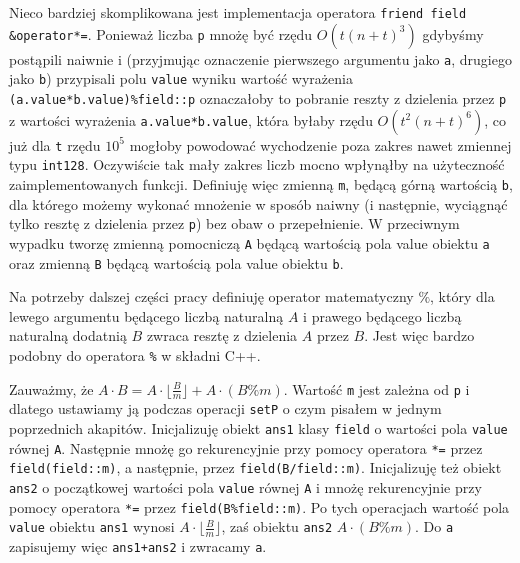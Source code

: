 \documentclass{article}
\begin{document}
Nieco bardziej skomplikowana jest implementacja operatora \texttt{friend field \&operator*=}. Ponieważ liczba 
\texttt{p} mnożę być rzędu $O(t(n+t)^3)$ gdybyśmy postąpili naiwnie i (przyjmując 
oznaczenie pierwszego argumentu jako \texttt{a}, drugiego jako \texttt{b}) 
przypisali polu \texttt{value} wyniku wartość wyrażenia
\newline \texttt{(a.value*b.value)\%field::p} oznaczałoby to pobranie reszty z dzielenia przez \texttt{p} z 
wartości wyrażenia
\texttt{a.value*b.value}, która 
byłaby rzędu $O(t^2(n+t)^6)$, co już dla \texttt{t} rzędu $10^5$ mogłoby powodować 
wychodzenie poza zakres nawet zmiennej typu 
\texttt{\textunderscore \textunderscore int128}. 
Oczywiście tak mały zakres liczb mocno wpłynąłby na użyteczność
zaimplementowanych funkcji. Definiuję więc zmienną \texttt{m}, będącą 
górną wartością \texttt{b}, dla którego możemy wykonać mnożenie w sposób naiwny 
(i następnie, wyciągnąć tylko resztę z dzielenia przez \texttt{p}) bez obaw o przepełnienie.
W przeciwnym wypadku tworzę zmienną pomocniczą \texttt{A} będącą wartością pola value
obiektu \texttt{a} oraz zmienną \texttt{B} będącą wartością pola value obiektu 
\texttt{b}.
\begin{tcolorbox}
\begin{center}
    Na potrzeby dalszej części pracy definiuję operator matematyczny $\%$, który dla lewego 
    argumentu będącego liczbą naturalną $A$ i prawego będącego liczbą naturalną dodatnią 
    $B$ zwraca resztę z dzielenia $A$ przez $B$. Jest więc bardzo podobny do operatora 
    \texttt{\%} w składni C++.
\end{center}    
\end{tcolorbox}
Zauważmy, że $A \cdot B = A \cdot \lfloor \frac{B}{m} \rfloor  + A \cdot (B \% m)$. 
Wartość \texttt{m} jest zależna od \texttt{p} i dlatego ustawiamy ją podczas operacji 
\texttt{setP} o czym pisałem w 
jednym poprzednich akapitów. Inicjalizuję obiekt \texttt{ans1} klasy \texttt{field} o wartości pola \texttt{value} równej \texttt{A}.
Następnie mnożę go rekurencyjnie przy pomocy operatora \texttt{*=} przez \texttt{field(field::m)}, a następnie, przez 
\texttt{field(B/field::m)}. Inicjalizuję też obiekt \texttt{ans2} o początkowej wartości pola \texttt{value}
równej \texttt{A} i mnożę rekurencyjnie przy pomocy operatora \texttt{*=} przez \texttt{field(B\%field::m)}. 
Po tych operacjach wartość pola \texttt{value} obiektu \texttt{ans1} wynosi $A \cdot \lfloor \frac{B}{m} \rfloor$, zaś 
obiektu \texttt{ans2} $A \cdot (B \% m)$. Do \texttt{a} zapisujemy więc \texttt{ans1+ans2} i zwracamy \texttt{a}.
\end{document}
